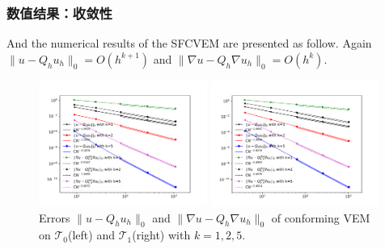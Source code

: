 \documentclass[notheorems,serif]{beamer}
\begin{document}
\begin{frame}
    \frametitle{数值结果：收敛性}
And the numerical results of the SFCVEM are presented as follow. 
Again $\|u - Q_h u_h\|_0=O(h^{k+1})$ and $\|\nabla u - Q_{h}\nabla
u_h\|_0=O(h^{k})$. 

\begin{figure}[htbp]
\centering
\begin{minipage}[t]{0.49\linewidth}
\centering
\includegraphics[width=5.5cm]{../figures/stabfree/cvem_convex.pdf}
\end{minipage}%
\begin{minipage}[t]{0.49\linewidth}
\centering
\includegraphics[width=5.5cm]{../figures/stabfree/cvem_nonconvex.pdf}
\end{minipage}%
\centering
\caption{Errors $\|u - Q_h u_h\|_0$ and $\|\nabla u - Q_{h}\nabla u_h\|_0$
of conforming VEM on $\mathcal T_0$(left) and
$\mathcal T_1$(right) with $k=1, 2, 5$.}
\label{fig:rate2}
\end{figure}

\end{frame}
\end{document}
